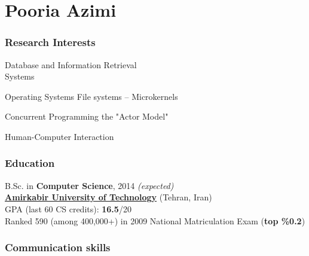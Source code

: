\documentclass{tccv}
\begin{document}
\thispagestyle{empty}
\part{Pooria Azimi}





\section{Research Interests}


\begin{research_interest}

\item{Database and Information Retrieval\\[4pt]Systems}
     {}

\item{Operating Systems}
     {File systems -- Microkernels}

\item{Concurrent Programming}
     {the "Actor Model"}

\item{Human-Computer Interaction}
     {}

\end{research_interest}





\vspace{6.5pt}



\section{Education}

B.Sc. in {\bf Computer Science}, 2014 {\it(expected)}
\\[1.5pt]
{\bf \href{https://en.wikipedia.org/wiki/Amirkabir_University_of_Technology}{Amirkabir University of Technology}} (Tehran, Iran)
\\[1.7pt]
GPA (last 60 CS credits): {\bf 16.5}/20
\bigskip\\
Ranked 590 (among 400,000+) in 2009 National Matriculation Exam ({\bf top \%0.2})



\vspace{10pt}




\section{Communication skills}
\end{document}
